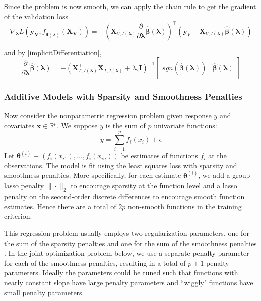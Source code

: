 \documentclass[12pt]{article}
\begin{document}
Since the problem is now smooth, we can apply the chain rule to get the gradient of the validation loss
\begin{equation}
\nabla_{\boldsymbol \lambda} L(\boldsymbol{y_V}, f_{\hat{\boldsymbol{\theta}}(\lambda)}(\boldsymbol{X_V})) =
- \left (
\boldsymbol{X}_{V, I(\boldsymbol\lambda)}
\frac{\partial}{\partial \boldsymbol \lambda} \hat{\boldsymbol{\beta}}(\boldsymbol{\lambda})
\right )^{\top}
\left (
\boldsymbol y_V - \boldsymbol{X}_{V, I(\boldsymbol\lambda)} \hat{\boldsymbol{\beta}} (\boldsymbol{\lambda})
\right )
\end{equation}

and by \eqref{implicitDifferentiation},
\begin{equation}
\frac{\partial}{\partial \boldsymbol \lambda} \hat{\boldsymbol{\beta}}(\boldsymbol{\lambda}) = 
- \left ( 
\boldsymbol{X}_{T, I(\boldsymbol\lambda)}^\top \boldsymbol{X}_{T, I(\boldsymbol\lambda)} + \lambda_2 \boldsymbol{I}
\right )^{-1}
\begin{bmatrix}
sgn \left (\hat{\boldsymbol{\beta}} (\boldsymbol{\lambda}) \right ) &
\hat{\boldsymbol{\beta}} (\boldsymbol{\lambda})
\end{bmatrix}
\end{equation}

\subsubsection{Additive Models with Sparsity and Smoothness Penalties}\label{sec:additive}

Now consider the nonparametric regression problem given response $y$ and covariates $\boldsymbol{x} \in \mathbb{R}^p$. We suppose $y$ is the sum of $p$ univariate functions:
\begin{equation}
y = \sum_{i=1}^p f_i(x_i) + \epsilon
\end{equation}
Let $\boldsymbol{\theta}^{(i)} \equiv (f_i(x_{i1}), ..., f_i(x_{in}))$ be estimates of functions $f_i$ at the observations. The model is fit using the least squares loss with sparsity and smoothness penalties. More specifically, for each estimate $\boldsymbol{\theta}^{(i)}$, we add a group lasso penalty $\| \cdot \|_2$ to encourage sparsity at the function level and a lasso penalty on the second-order discrete differences to encourage smooth function estimates. Hence there are a total of $2p$ non-smooth functions in the training criterion.

This regression problem usually employs two regularization parameters, one for the sum of the sparsity penalties and one for the sum of the smoothness penalties \citep{buhlmann2011statistics}. In the joint optimization problem below, we use a separate penalty parameter for each of the smoothness penalties, resulting in a total of $p+1$ penalty parameters. Ideally the parameters could be tuned such that functions with nearly constant slope have large penalty parameters and ``wiggly" functions have small penalty parameters.
\end{document}
